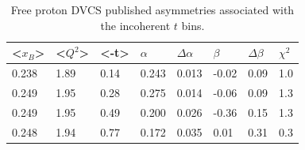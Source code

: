 \begin {table}[!h]
\begin{center}
\begin{tabular}{|l|l|l|l|l|l|l|l|}
\hline
<$x_{B}$> & <$Q^2$> & <-t> & $\alpha$ & $\Delta \alpha$ &  $\beta$ & $\Delta 
   \beta$ & $\chi^{2}$\\
\hline
0.238  & 1.89 & 0.14 & 0.243 & 0.013 & -0.02 & 0.09 & 1.0\\
\hline
0.249  & 1.95 & 0.28 & 0.275 & 0.014 & -0.06 & 0.09 & 1.3\\
\hline
0.249  & 1.95 & 0.49 & 0.200 & 0.026 & -0.36 & 0.15 & 1.3\\
\hline
0.248  & 1.94 & 0.77 & 0.172 & 0.035 & 0.01 &  0.31 & 0.3\\
\hline
\end{tabular}
   \caption{Free proton DVCS published asymmetries associated with the 
   incoherent $t$ bins.}
\label{Table:freeproton-t_bins}
\end{center}
\end{table}





